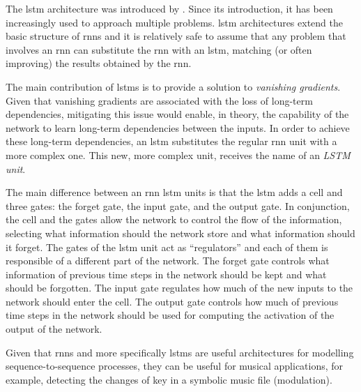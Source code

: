 

The \gls{lstm} architecture was introduced by
\textcite{hochreiter1997long}. Since its introduction, it
has been increasingly used to approach multiple problems.
\gls{lstm} architectures extend the basic structure of
\glspl{rnn} and it is relatively safe to assume that any
problem that involves an \gls{rnn} can substitute the
\gls{rnn} with an \gls{lstm}, matching (or often improving)
the results obtained by the \gls{rnn}.

The main contribution of \glspl{lstm} is to provide a
solution to \emph{vanishing gradients}. Given that vanishing
gradients are associated with the loss of long-term
dependencies, mitigating this issue would enable, in theory,
the capability of the network to learn long-term
dependencies between the inputs. In order to achieve these
long-term dependencies, an \gls{lstm} substitutes the
regular \gls{rnn} unit with a more complex one. This new,
more complex unit, receives the name of an \emph{LSTM unit}.

The main difference between an \gls{rnn} \gls{lstm} units is
that the \gls{lstm} adds a cell and three gates: the forget
gate, the input gate, and the output gate. In conjunction,
the cell and the gates allow the network to control the flow
of the information, selecting what information should the
network store and what information should it forget. The
gates of the \gls{lstm} unit act as ``regulators'' and each
of them is responsible of a different part of the network.
The forget gate controls what information of previous time
steps in the network should be kept and what should be
forgotten. The input gate regulates how much of the new
inputs to the network should enter the cell. The output gate
controls how much of previous time steps in the network
should be used for computing the activation of the output of
the network.

Given that \glspl{rnn} and more specifically \glspl{lstm}
are useful architectures for modelling sequence-to-sequence
processes, they can be useful for musical applications, for
example, detecting the changes of key in a symbolic music
file (modulation).


